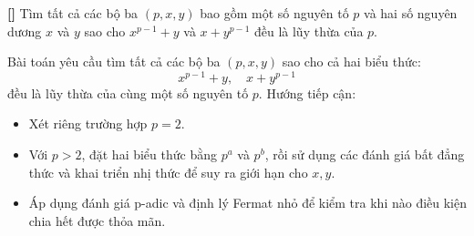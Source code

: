 \documentclass[../05-modular-arithmetic-a.tex]{subfiles}
\begin{document}
\begin{example*}\label{example:IND-2015-TST3-P2}\textbf{[]}
	Tìm tất cả các bộ ba \( (p, x, y) \) bao gồm một số nguyên tố \( p \) và hai số nguyên dương \( x \) và \( y \)
	sao cho \( x^{p-1} + y \) và \( x + y^{p-1} \) đều là lũy thừa của \( p \).
\end{example*}

\begin{story*}
	Bài toán yêu cầu tìm tất cả các bộ ba \( (p, x, y) \) sao cho cả hai biểu thức:
	\[
		x^{p-1} + y,\quad x + y^{p-1}
	\]
	đều là lũy thừa của cùng một số nguyên tố \( p \). Hướng tiếp cận:
	\begin{itemize}[topsep=0pt, partopsep=0pt, itemsep=0pt]
		\item Xét riêng trường hợp \( p = 2 \).
		\item Với \( p > 2 \), đặt hai biểu thức bằng \( p^a \) và \( p^b \), rồi sử dụng các đánh giá bất đẳng thức và khai triển nhị thức để suy ra giới hạn cho \( x, y \).
		\item Áp dụng đánh giá p-adic và định lý Fermat nhỏ để kiểm tra khi nào điều kiện chia hết được thỏa mãn.
	\end{itemize}
\end{story*}

\bigbreak
\end{document}
